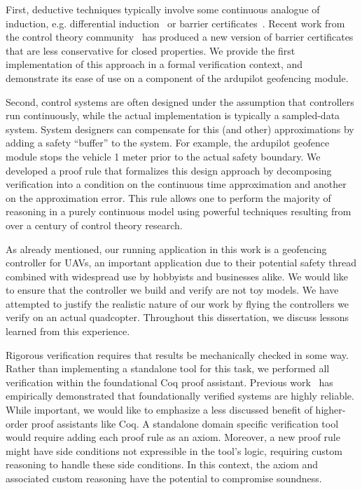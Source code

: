 \documentclass[12pt]{ucsddissertation}
\begin{document}
\begin{dissertationintroduction}
First, deductive techniques typically involve some continuous analogue of
induction, e.g. differential induction~\cite{Ghorbal14diffinv} or barrier
certificates~\cite{prajna04barrier}. Recent work from the control theory
community~\cite{kong2013barrier,xu15barrier,nguyen16barrier} has produced a
new version of barrier certificates that are less conservative for closed
properties. We provide the first implementation of this approach in a
formal verification context, and demonstrate its ease of use on a component
of the ardupilot geofencing module.

Second, control systems are often designed under the assumption that
controllers run continuously, while the actual implementation is typically
a sampled-data system. System designers can compensate for this (and other)
approximations by adding a safety ``buffer'' to the system. For example,
the ardupilot geofence module stops the vehicle 1 meter prior to the actual
safety boundary. We developed a proof rule that formalizes this design
approach by decomposing verification into a condition on the continuous
time approximation and another on the approximation error.  This rule
allows one to perform the majority of reasoning in a purely continuous
model using powerful techniques resulting from over a century of control
theory research.

As already mentioned, our running application in this work is a geofencing
controller for UAVs, an important application due to their potential safety
thread combined with widespread use by hobbyists and businesses alike. We
would like to ensure that the controller we build and verify are not toy
models. We have attempted to justify the realistic nature of our work by
flying the controllers we verify on an actual quadcopter. Throughout this
dissertation, we discuss lessons learned from this experience.

Rigorous verification requires that results be mechanically checked in some
way. Rather than implementing a standalone tool for this task, we performed
all verification within the foundational Coq proof assistant. Previous
work~\cite{yang2011understanding-compiler-bugs} has empirically
demonstrated that foundationally verified systems are highly
reliable. While important, we would like to emphasize a less discussed
benefit of higher-order proof assistants like Coq. A standalone domain
specific verification tool would require adding each proof rule as an
axiom. Moreover, a new proof rule might have side conditions not
expressible in the tool's logic, requiring custom reasoning to handle these
side conditions. In this context, the axiom and associated custom reasoning
have the potential to compromise soundness.


\end{dissertationintroduction}
\end{document}
